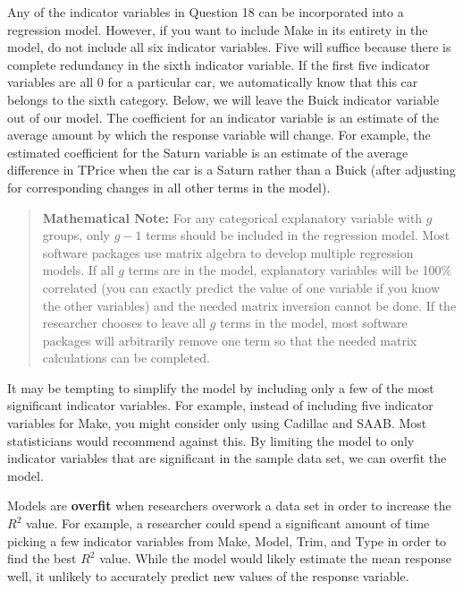 \documentclass[
]{report}
\begin{document}
Any of the indicator variables in Question 18 can be incorporated into a regression model. However, if you want to include Make in its entirety in the model, do not include all six indicator variables. Five will suffice because there is complete redundancy in the sixth indicator variable. If the first five indicator variables are all 0 for a particular car, we automatically know that this car belongs to the sixth category. Below, we will leave the Buick indicator variable out of our model. The coefficient for an indicator variable is an estimate of the average amount by which the response variable will change. For example, the estimated coefficient for the Saturn variable is an estimate of the average difference in TPrice when the car is a Saturn rather than a Buick (after adjusting for corresponding changes in all other terms in the model).

\begin{quote}
\textbf{Mathematical Note:}
For any categorical explanatory variable with \(\scriptstyle g\) groups, only \(\scriptstyle g - 1\) terms should be included in the regression model. Most software packages use matrix algebra to develop multiple regression models. If all \(\scriptstyle g\) terms are in the model, explanatory variables will be 100\% correlated (you can exactly predict the value of one variable if you know the other variables) and the needed matrix inversion cannot be done. If the researcher chooses to leave all \(\scriptstyle g\) terms in the model, most software packages will arbitrarily remove one term so that the needed matrix calculations can be completed.
\end{quote}

It may be tempting to simplify the model by including only a few of the most significant indicator variables. For example, instead of including five indicator variables for Make, you might consider only using Cadillac and SAAB. Most statisticians would recommend against this. By limiting the model to only indicator variables that are significant in the sample data set, we can overfit the model.

Models are \textbf{overfit} when researchers overwork a data set in order to increase the \(\scriptstyle {R}^2\) value. For example, a researcher could spend a significant amount of time picking a few indicator variables from Make, Model, Trim, and Type in order to find the best \(\scriptstyle {R}^2\) value. While the model would likely estimate the mean response well, it unlikely to accurately predict new values of the response variable.
\end{document}
